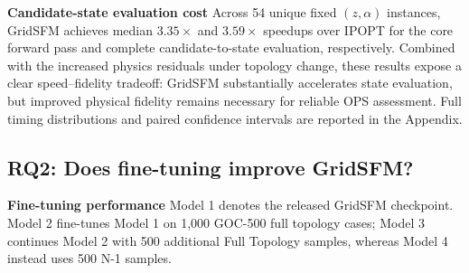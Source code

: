 \documentclass{article}
\begin{document}
\noindent\textbf{Candidate-state evaluation cost}\enspace
Across 54 unique fixed $(z,\alpha)$ instances, GridSFM achieves median
$3.35\times$ and $3.59\times$ speedups over IPOPT for the core forward pass
and complete candidate-to-state evaluation, respectively. Combined with the
increased physics residuals under topology change, these results expose a
clear speed--fidelity tradeoff: GridSFM substantially accelerates state
evaluation, but improved physical fidelity remains necessary for reliable OPS
assessment. Full timing distributions and paired confidence intervals are
reported in the Appendix.

\subsection{RQ2: Does fine-tuning improve GridSFM?}

\noindent\textbf{Fine-tuning performance}\enspace
Model 1 denotes the released GridSFM checkpoint. Model 2 fine-tunes Model 1 on 1,000
GOC-500 full topology cases; Model 3 continues Model 2 with 500 additional Full Topology samples,
whereas Model 4 instead uses 500 N-1 samples. 

\begin{table}[!htbp]
    \centering
    \caption{Fine-tuning evaluation and physics transfer.}
    \label{tab:finetune}
    \scriptsize
    \renewcommand{\arraystretch}{0.90}
    \setlength{\tabcolsep}{2.0pt}
\end{table}
\end{document}
